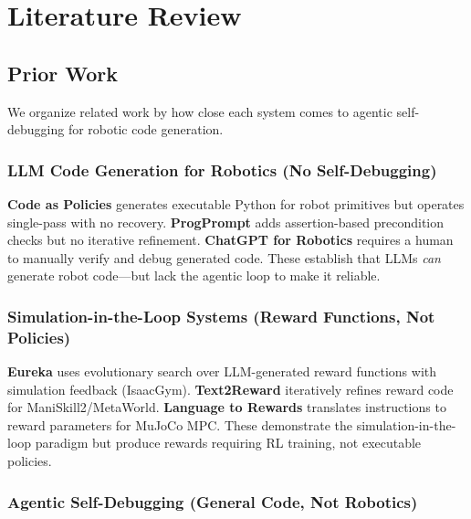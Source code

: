 \documentclass[11pt]{article}
\begin{document}
\section{Literature Review}
\label{sec:literature}

\subsection{Prior Work}

We organize related work by how close each system comes to agentic self-debugging for robotic code generation.

\subsubsection{LLM Code Generation for Robotics (No Self-Debugging)}

\textbf{Code as Policies} \citep{liang2023code} generates executable Python for robot primitives but operates single-pass with no recovery.
\textbf{ProgPrompt} \citep{singh2023progprompt} adds assertion-based precondition checks but no iterative refinement.
\textbf{ChatGPT for Robotics} \citep{vemprala2023chatgpt} requires a human to manually verify and debug generated code.
These establish that LLMs \emph{can} generate robot code---but lack the agentic loop to make it reliable.

\subsubsection{Simulation-in-the-Loop Systems (Reward Functions, Not Policies)}

\textbf{Eureka} \citep{ma2024eureka} uses evolutionary search over LLM-generated reward functions with simulation feedback (IsaacGym). \textbf{Text2Reward} \citep{xie2024text2reward} iteratively refines reward code for ManiSkill2/MetaWorld. \textbf{Language to Rewards} \citep{yu2023language} translates instructions to reward parameters for MuJoCo MPC. These demonstrate the simulation-in-the-loop paradigm but produce rewards requiring RL training, not executable policies.

\subsubsection{Agentic Self-Debugging (General Code, Not Robotics)}
\end{document}
